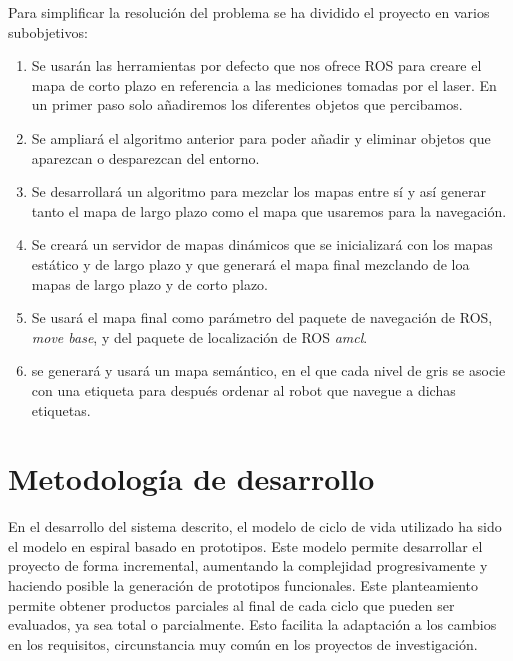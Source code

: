 Para simplificar la resolución del problema se ha dividido el proyecto en varios subobjetivos:

\begin{enumerate}
\item Se usarán las herramientas por defecto que nos ofrece ROS para creare el mapa de corto plazo en referencia a las mediciones tomadas por el laser. En un primer paso solo añadiremos los diferentes objetos que percibamos.
\item Se ampliará el algoritmo anterior para poder añadir y eliminar objetos que aparezcan o desparezcan del entorno. 
\item Se desarrollará un algoritmo para mezclar los mapas entre sí y así generar tanto el mapa de largo plazo como el mapa que usaremos para la navegación.
\item Se creará un servidor de mapas dinámicos que se inicializará con los mapas estático y de largo plazo y que generará el mapa final mezclando de loa mapas de largo plazo y de corto plazo.
\item Se usará el mapa final como parámetro del paquete de navegación de ROS, \textit{move base}, y del paquete de localización de ROS \textit{amcl}.
\item se generará y usará un mapa semántico, en el que cada nivel de gris se asocie con una etiqueta para después ordenar al robot que navegue a dichas etiquetas.
\end{enumerate}

\section{Metodología de desarrollo}
\label{sec:metodologiadedesarrollo}

En el desarrollo del sistema descrito, el modelo de ciclo de vida utilizado ha sido el modelo en espiral basado en prototipos. Este modelo permite desarrollar el proyecto de forma incremental, aumentando la complejidad progresivamente y haciendo posible la generación de prototipos funcionales. Este planteamiento permite obtener productos parciales al final de cada ciclo que pueden ser evaluados, ya sea total o parcialmente. Esto facilita la adaptación a los cambios en los requisitos, circunstancia muy común en los proyectos de investigación.\\

